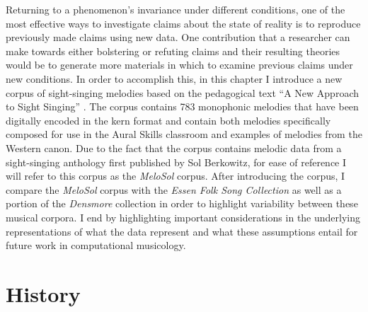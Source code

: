 \documentclass[12pt,]{book}
\begin{document}
Returning to a phenomenon's invariance under different conditions, one of the most effective ways to investigate claims about the state of reality is to reproduce previously made claims using new data.
One contribution that a researcher can make towards either bolstering or refuting claims and their resulting theories would be to generate more materials in which to examine previous claims under new conditions.
In order to accomplish this, in this chapter I introduce a new corpus of sight-singing melodies based on the pedagogical text ``A New Approach to Sight Singing'' \citep{berkowitzNewApproachSight2011}.
The corpus contains 783 monophonic melodies that have been digitally encoded in the kern format \citep{huronHumdrumToolkitReference1994} and contain both melodies specifically composed for use in the Aural Skills classroom and examples of melodies from the Western canon.
Due to the fact that the corpus contains melodic data from a sight-singing anthology first published by Sol Berkowitz, for ease of reference I will refer to this corpus as the \emph{MeloSol} corpus.
After introducing the corpus, I compare the \emph{MeloSol} corpus with the \emph{Essen Folk Song Collection} \citep{schaffrathEssenFolkSong1995} as well as a portion of the \emph{Densmore} collection \citep{shanahanDensmoreCollectionNative2014} in order to highlight variability between these musical corpora.
I end by highlighting important considerations in the underlying representations of what the data represent and what these assumptions entail for future work in computational musicology.

\hypertarget{history}{%
\section{History}\label{history}}
\end{document}
